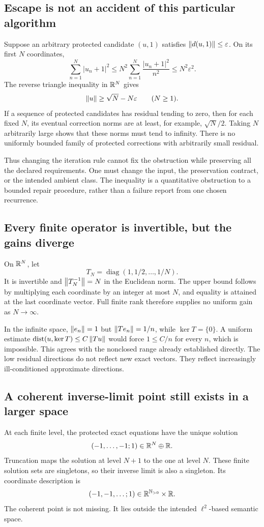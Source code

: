 \subsection{Escape is not an accident of this particular algorithm}
Suppose an arbitrary protected candidate \((u,1)\) satisfies \(\left\lVert d(u,1)\right\rVert\le\varepsilon\). On its first \(N\) coordinates,
\[
 \sum_{n=1}^{N}|u_n+1|^2
 \le N^2\sum_{n=1}^{N}\frac{|u_n+1|^2}{n^2}
 \le N^2\varepsilon^2.
\]
The reverse triangle inequality in \(\mathbb R^N\) gives
\begin{equation}\label{eq:escape-necessity}
 \left\lVert u\right\rVert\ge\sqrt N-N\varepsilon\qquad(N\ge1).
\end{equation}
If a sequence of protected candidates has residual tending to zero, then for each fixed \(N\), its eventual correction norms are at least, for example, \(\sqrt N/2\). Taking \(N\) arbitrarily large shows that these norms must tend to infinity. There is no uniformly bounded family of protected corrections with arbitrarily small residual.

Thus changing the iteration rule cannot fix the obstruction while preserving all the declared requirements. One must change the input, the preservation contract, or the intended ambient class. The inequality is a quantitative obstruction to a bounded repair procedure, rather than a failure report from one chosen recurrence.

\subsection{Every finite operator is invertible, but the gains diverge}
On \(\mathbb R^N\), let
\[
 T_N=\operatorname{diag}(1,1/2,\ldots,1/N).
\]
It is invertible and \(\left\lVert T_N^{-1}\right\rVert=N\) in the Euclidean norm. The upper bound follows by multiplying each coordinate by an integer at most \(N\), and equality is attained at the last coordinate vector. Full finite rank therefore supplies no uniform gain as \(N\to\infty\).

In the infinite space, \(\left\lVert e_n\right\rVert=1\) but \(\left\lVert Te_n\right\rVert=1/n\), while \(\ker T=\{0\}\). A uniform estimate
\(\operatorname{dist}(u,\ker T)\le C\left\lVert Tu\right\rVert\) would force \(1\le C/n\) for every \(n\), which is impossible. This agrees with the nonclosed range already established directly. The low residual directions do not reflect new exact vectors. They reflect increasingly ill-conditioned approximate directions.

\subsection{A coherent inverse-limit point still exists in a larger space}
At each finite level, the protected exact equations have the unique solution
\[
 (-1,\ldots,-1;1)\in\mathbb R^N\oplus\mathbb R.
\]
Truncation maps the solution at level \(N+1\) to the one at level \(N\). These finite solution sets are singletons, so their inverse limit is also a singleton. Its coordinate description is
\[
 (-1,-1,\ldots;1)\in\mathbb R^{\mathbb N_{>0}}\times\mathbb R.
\]
The coherent point is not missing. It lies outside the intended \(\ell^2\)-based semantic space.

